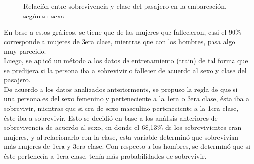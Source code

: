 \documentclass[letter, 10pt]{article}
\begin{document}
\begin{figure}[H]
\caption{Relación entre sobrevivencia y clase del pasajero en la embarcación, según su sexo.}
\end{figure}

En base a estos gráficos, se tiene que de las mujeres que fallecieron, casi el 90\% corresponde a mujeres de 3era clase,  mientras que con los hombres, pasa algo muy parecido.\\

Luego, se aplicó un método a los datos de entrenamiento (train) de tal forma que se predijera si la persona iba a sobrevivir o fallecer de acuerdo al sexo y clase del pasajero.\\

De acuerdo a los datos analizados anteriormente, se propuso la regla de que si una persona es del sexo femenino  y perteneciente a la 1era o 3era clase, ésta iba a sobrevivir, mientras que si era de sexo masculino perteneciente a la 1era clase, éste iba a sobrevivir. Esto se decidió en base a los análisis anteriores de sobrevivencia de acuerdo al sexo, en donde el 68,13\% de los sobrevivientes eran mujeres, y al relacionarlo con la clase, esta variable determinó que sobrevivían más mujeres de 1era y 3era clase. Con respecto a los hombres, se determinó que si éste pertenecía a 1era clase, tenía más probabilidades de sobrevivir.\\
\end{document}

